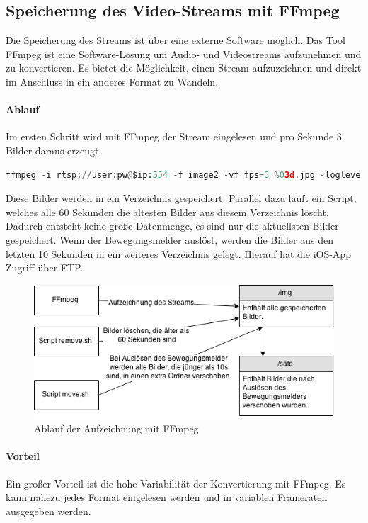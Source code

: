 \subsection{Speicherung des Video-Streams mit FFmpeg}
Die Speicherung des Streams ist über eine externe Software möglich. Das Tool FFmpeg ist eine Software-Lösung um Audio- und Videostreams aufzunehmen und zu konvertieren. Es bietet die Möglichkeit, einen Stream aufzuzeichnen und direkt im Anschluss in ein anderes Format zu Wandeln. 
\paragraph{Ablauf}
Im ersten Schritt wird mit FFmpeg der Stream eingelesen und pro Sekunde 3 Bilder daraus erzeugt. 
\begin{lstlisting}[caption = Aufnahme mit FFmpeg, language=python, frame=single, breaklines=true,columns=fullflexible, commentstyle=\color{gray}\upshape, captionpos=b]
ffmpeg -i rtsp://user:pw@$ip:554 -f image2 -vf fps=3 %03d.jpg -loglevel quiet
\end{lstlisting}

Diese Bilder werden in ein Verzeichnis gespeichert. Parallel dazu läuft ein Script, welches alle 60 Sekunden die ältesten Bilder aus diesem Verzeichnis löscht. Dadurch entsteht keine große Datenmenge, es sind nur die aktuellsten Bilder gespeichert. Wenn der Bewegungsmelder auslöst, werden die Bilder aus den letzten 10 Sekunden in ein weiteres Verzeichnis gelegt. Hierauf hat die iOS-App Zugriff über FTP.  \\
\begin{figure}[h]
\begin{minipage}{\textwidth}
	\centering
	\includegraphics[width=\textwidth]{./data/ffmpeg.png}
	\caption{Ablauf der Aufzeichnung mit FFmpeg}
\end{minipage}
\end{figure}
\paragraph{Vorteil}
Ein großer Vorteil ist die hohe Variabilität der Konvertierung mit FFmpeg. Es kann nahezu jedes Format eingelesen werden und in variablen Frameraten ausgegeben werden. 

